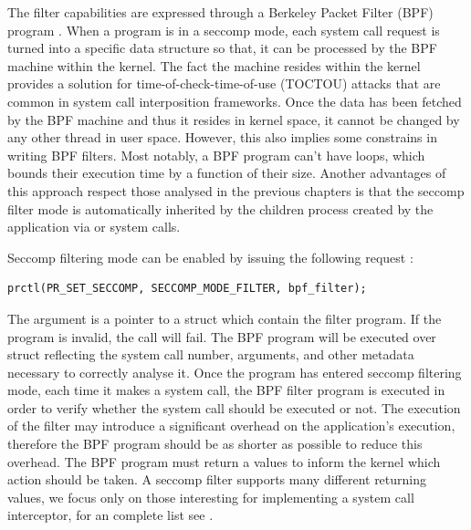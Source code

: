 The filter capabilities are expressed through a Berkeley Packet Filter (BPF) program \cite{bpf}. When a program is in a seccomp mode, each system call request is  turned into a specific data structure so that, it can be processed by the BPF machine within the kernel. The fact the machine resides within the kernel provides a solution for time-of-check-time-of-use (TOCTOU) attacks that are common in system call interposition frameworks. Once the data has been fetched by the BPF machine and thus it resides in kernel space, it cannot be changed by any other thread in user space. However, this also implies some constrains in writing BPF filters. Most notably, a BPF program can't have loops, which bounds their execution time by a function of their size. Another advantages of this approach respect those analysed in the previous chapters is that the seccomp filter mode is automatically inherited by the children process created by the application via  or  system calls.

Seccomp filtering mode can be enabled by issuing the following request : 

\begin{center}
\lstset{escapechar=@,style=c}
\begin{lstlisting}[caption={Request for entering seccomp filtering mode}]
												prctl(PR_SET_SECCOMP, SECCOMP_MODE_FILTER, bpf_filter);
\end{lstlisting}
\end{center}

The  argument is a pointer to a struct  which contain the filter program.  If the program is invalid, the call will fail. The BPF program will be executed over struct  reflecting the system call number, arguments, and other metadata necessary to correctly analyse it. Once the program has entered seccomp filtering mode, each time it makes a system call, the BPF filter program is executed in order to verify whether the system call should be executed or not. The execution of the filter may introduce a significant overhead on the application's execution, therefore the BPF program should be as shorter as possible to reduce this overhead. The BPF program must return a values to inform the kernel which action should be taken. A seccomp filter supports many different returning values, we focus only on those interesting for implementing a system call interceptor, for an complete list see \cite{filtering}.  


